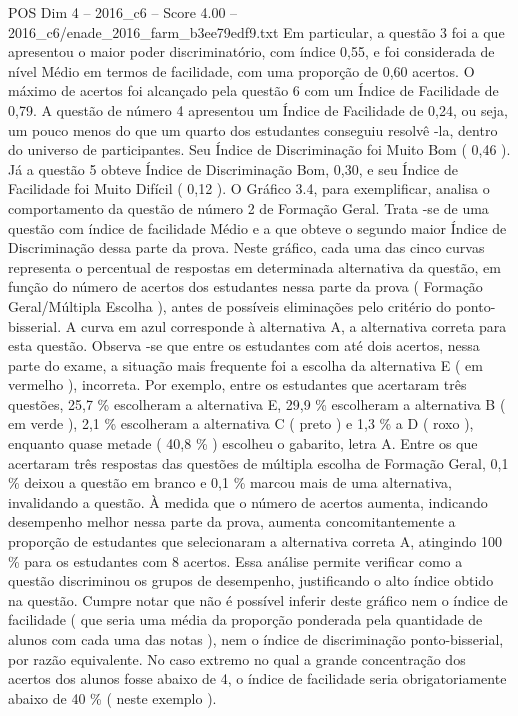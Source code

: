 \begin{textsample}{POS Dim 4 – 2016\_c6 – Score 4.00 – 2016\_c6/enade\_2016\_farm\_b3ee79edf9.txt}
Em particular, a questão 3 foi a que apresentou o maior poder discriminatório, com índice 0,55, e foi considerada de nível Médio em termos de facilidade, com uma proporção de 0,60 acertos.
O máximo de acertos foi alcançado pela questão 6 com um Índice de Facilidade de 0,79.
A questão de número 4 apresentou um Índice de Facilidade de 0,24, ou seja, um pouco menos do que um quarto dos estudantes conseguiu resolvê -la, dentro do universo de participantes.
Seu Índice de Discriminação foi Muito Bom ( 0,46 ).
Já a questão 5 obteve Índice de Discriminação Bom, 0,30, e seu Índice de Facilidade foi Muito Difícil ( 0,12 ).
O Gráfico 3.4, para exemplificar, analisa o comportamento da questão de número 2 de Formação Geral.
Trata -se de uma questão com índice de facilidade Médio e a que obteve o segundo maior Índice de Discriminação dessa parte da prova.
Neste gráfico, cada uma das cinco curvas representa o percentual de respostas em determinada alternativa da questão, em função do número de acertos dos estudantes nessa parte da prova ( Formação Geral/Múltipla Escolha ), antes de possíveis eliminações pelo critério do ponto-bisserial.
A curva em azul corresponde à alternativa A, a alternativa correta para esta questão.
Observa -se que entre os estudantes com até dois acertos, nessa parte do exame, a situação mais frequente foi a escolha da alternativa E ( em vermelho ), incorreta.
Por exemplo, entre os estudantes que acertaram três questões, 25,7 \% escolheram a alternativa E, 29,9 \% escolheram a alternativa B ( em verde ), 2,1 \% escolheram a alternativa C ( preto ) e 1,3 \% a D ( roxo ), enquanto quase metade ( 40,8 \% ) escolheu o gabarito, letra A.
Entre os que acertaram três respostas das questões de múltipla escolha de Formação Geral, 0,1 \% deixou a questão em branco e 0,1 \% marcou mais de uma alternativa, invalidando a questão.
À medida que o número de acertos aumenta, indicando desempenho melhor nessa parte da prova, aumenta concomitantemente a proporção de estudantes que selecionaram a alternativa correta A, atingindo 100 \% para os estudantes com 8 acertos.
Essa análise permite verificar como a questão discriminou os grupos de desempenho, justificando o alto índice obtido na questão.
Cumpre notar que não é possível inferir deste gráfico nem o índice de facilidade ( que seria uma média da proporção ponderada pela quantidade de alunos com cada uma das notas ), nem o índice de discriminação ponto-bisserial, por razão equivalente.
No caso extremo no qual a grande concentração dos acertos dos alunos fosse abaixo de 4, o índice de facilidade seria obrigatoriamente abaixo de 40 \% ( neste exemplo ).

\end{textsample}
